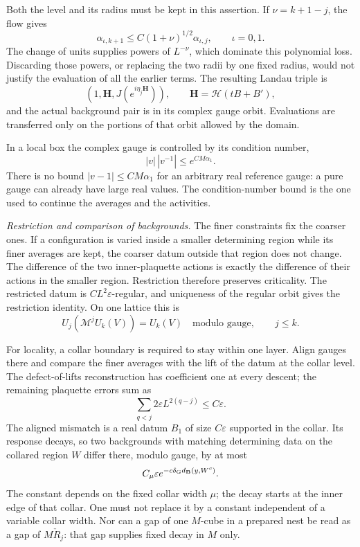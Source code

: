 \documentclass[11pt,letterpaper,reqno]{amsart}
\theoremstyle{definition}
\theoremstyle{remark}
\begin{document}
Both the level and its radius must be
kept in this assertion. If
$\nu=k+1-j$, the flow gives
\[
 \alpha_{\iota,k+1}
       \le C(1+\nu)^{1/2}\alpha_{\iota,j},
       \qquad \iota=0,1.
\]
The change of units supplies powers of
$L^{-\nu}$, which dominate this
polynomial loss. Discarding those powers,
or replacing the two radii by one fixed
radius, would not justify the evaluation
of all the earlier terms. The resulting
Landau triple is
\[
 (1,\mathbf H,J(e^{i\eta_j\mathbf H})),
 \qquad \mathbf H=\mathcal H(tB+B'),
\]
and the actual background pair is in
its complex gauge orbit. Evaluations
are transferred only on the portions
of that orbit allowed by the domain.

In a local box the complex gauge is
controlled by its condition number,
\[
 |v|\,|v^{-1}|\le e^{CM\alpha_1}.
\]
There is no bound $|v-1|\le CM\alpha_1$
for an arbitrary real reference gauge:
a pure gauge can already have large
real values. The condition-number
bound is the one used to continue
the averages and the activities.

\emph{Restriction and comparison of backgrounds.}
The finer constraints fix the coarser
ones. If a configuration is varied
inside a smaller determining region
while its finer averages are kept,
the coarser datum outside that region
does not change. The difference of
the two inner-plaquette actions is
exactly the difference of their
actions in the smaller region.
Restriction therefore preserves
criticality. The restricted datum
is $CL^2\varepsilon$-regular, and
uniqueness of the regular orbit gives
the restriction identity.
On one lattice this is
\[
 U_j(\mathcal M^jU_k(V))=U_k(V)
                  \quad\text{modulo gauge},\qquad j\le k.
\]

For locality, a collar boundary is
required to stay within one layer.
Align gauges there and compare the
finer averages with the lift of the
datum at the collar level. The
defect-of-lifts reconstruction has
coefficient one at every descent;
the remaining plaquette errors sum
as
\[
 \sum_{q<j}2\varepsilon L^{2(q-j)}
                                     \le C\varepsilon.
\]
The aligned mismatch is a real datum
$B_1$ of size $C\varepsilon$ supported
in the collar. Its response decays,
so two backgrounds with matching
determining data on the collared
region $W$ differ there, modulo gauge,
by at most
\[
 C_\mu\varepsilon
       e^{-c\delta_{\rm G}d_{\mathbf B}(y,W^c)}.
\]
The constant depends on the fixed
collar width $\mu$; the decay starts
at the inner edge of that collar.
One must not replace it by a constant
independent of a variable collar
width. Nor can a gap of one $M$-cube
in a prepared nest be read as a gap
of $M\check R_j$: that gap supplies
fixed decay in $M$ only.
\end{document}
